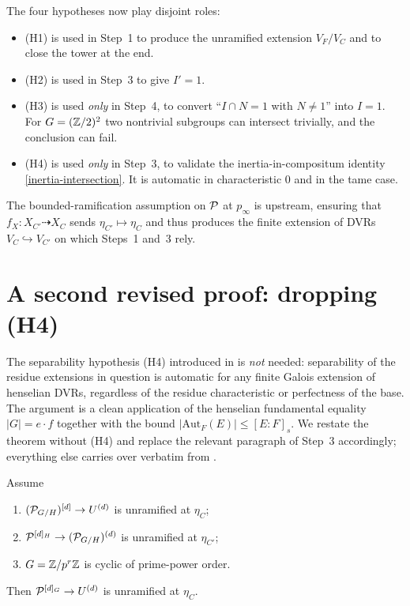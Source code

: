 \documentclass[11pt]{article}
\begin{document}
\begin{rem*}\label{rem:where-each-hypothesis-bites}
The four hypotheses now play disjoint roles:
\begin{itemize}
  \item (H1) is used in Step~1 to produce the unramified extension
        $V_F/V_C$ and to close the tower at the end.
  \item (H2) is used in Step~3 to give $I' = 1$.
  \item (H3) is used \emph{only} in Step~4, to convert
        ``$I \cap N = 1$ with $N \neq 1$'' into $I = 1$.  For
        $G = (\mathbb{Z}/2)^2$ two nontrivial subgroups can intersect trivially,
        and the conclusion can fail.
  \item (H4) is used \emph{only} in Step~3, to validate the
        inertia-in-compositum identity \eqref{inertia-intersection}.
        It is automatic in characteristic $0$ and in the tame case.
\end{itemize}
The bounded-ramification assumption on $\mathcal{P}$ at $p_\infty$ is upstream,
ensuring that $f_X \colon X_{C'} \dashrightarrow X_C$ sends
$\eta_{C'} \mapsto \eta_C$ and thus produces the finite extension of DVRs
$V_C \hookrightarrow V_{C'}$ on which Steps~1 and~3 rely.
\end{rem*}

\section{A second revised proof: dropping \texorpdfstring{(H4)}{(H4)}}\label{sec:main-revised-2}

The separability hypothesis (H4) introduced in  is
\emph{not} needed: separability of the residue extensions in question is
automatic for any finite Galois extension of henselian DVRs, regardless of
the residue characteristic or perfectness of the base.  The argument is a
clean application of the henselian fundamental equality $|G| = e \cdot f$
together with the bound $|\mathrm{Aut}_F(E)| \leq [E:F]_s$.  We restate the
theorem without (H4) and replace the relevant paragraph of Step~3
accordingly; everything else carries over verbatim from
.

\begin{theorem}\label{thm:main-revised-2}
Assume
\begin{enumerate}
  \item[\textnormal{(H1)}] $(\mathcal{P}_{G/H})^{[d]} \to U^{(d)}$ is unramified at
        $\eta_C$;
  \item[\textnormal{(H2)}] $\mathcal{P}^{[d]_H} \to (\mathcal{P}_{G/H})^{(d)}$ is unramified at
        $\eta_{C'}$;
  \item[\textnormal{(H3)}] $G = \mathbb{Z}/p^r\mathbb{Z}$ is cyclic of prime-power order.
\end{enumerate}
Then $\mathcal{P}^{[d]_G} \to U^{(d)}$ is unramified at $\eta_C$.
\end{theorem}
\end{document}
